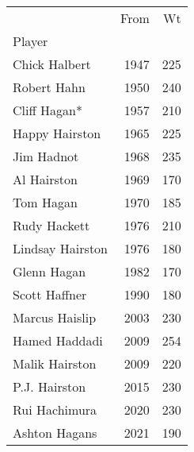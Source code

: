 \begin{tabular}{lrr}

{} &  From &   Wt \\
Player           &       &      \\

Chick Halbert    &  1947 &  225 \\
Robert Hahn      &  1950 &  240 \\
Cliff Hagan*     &  1957 &  210 \\
Happy Hairston   &  1965 &  225 \\
Jim Hadnot       &  1968 &  235 \\
Al Hairston      &  1969 &  170 \\
Tom Hagan        &  1970 &  185 \\
Rudy Hackett     &  1976 &  210 \\
Lindsay Hairston &  1976 &  180 \\
Glenn Hagan      &  1982 &  170 \\
Scott Haffner    &  1990 &  180 \\
Marcus Haislip   &  2003 &  230 \\
Hamed Haddadi    &  2009 &  254 \\
Malik Hairston   &  2009 &  220 \\
P.J. Hairston    &  2015 &  230 \\
Rui Hachimura    &  2020 &  230 \\
Ashton Hagans    &  2021 &  190 \\

\end{tabular}
